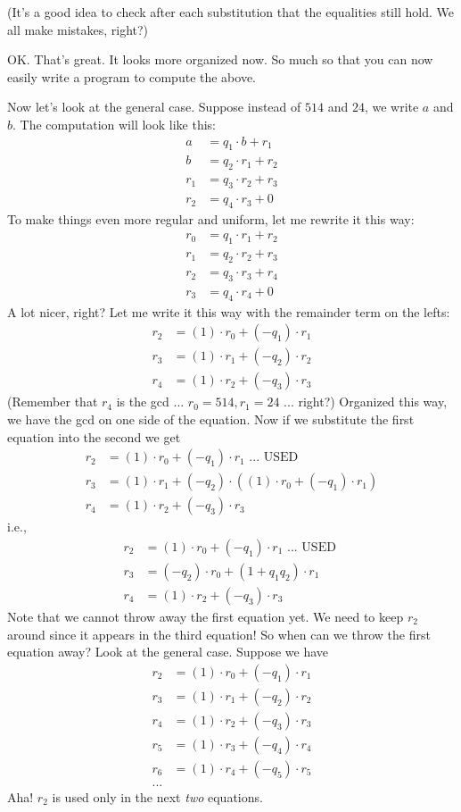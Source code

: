 (It's a good idea to check after each substitution that
the equalities still hold. We all make mistakes, right?)

OK.
That's great.
It looks more organized now.
So much so that you can now easily write a program to compute
the above.


Now let's look at the general case.
Suppose instead of $514$ and $24$, we write $a$ and $b$.
The computation will look like this:
\begin{align*}
a   &= q_1 \cdot b   + r_1 \\
b   &= q_2 \cdot r_1 + r_2 \\
r_1 &= q_3 \cdot r_2 + r_3 \\
r_2 &= q_4 \cdot r_3 + 0
\end{align*}
To make things even more regular and uniform, let me rewrite it this way:
\begin{align*}
r_0 &= q_1 \cdot r_1 + r_2 \\
r_1 &= q_2 \cdot r_2 + r_3 \\
r_2 &= q_3 \cdot r_3 + r_4 \\
r_3 &= q_4 \cdot r_4 + 0
\end{align*}
A lot nicer, right?
Let me write it this way with the remainder term on the lefts:
\begin{align*}
r_2 &= (1) \cdot r_0 + (-q_1) \cdot r_1 \\
r_3 &= (1) \cdot r_1 + (-q_2) \cdot r_2 \\
r_4 &= (1) \cdot r_2 + (-q_3) \cdot r_3 
\end{align*}
(Remember that $r_4$ is the gcd ... $r_0 = 514, r_1 = 24$ ... right?)
Organized this way, we have the gcd on one side of the equation.
Now if we substitute the first equation into the second we get
\begin{align*}
r_2 &= (1) \cdot r_0 + (-q_1) \cdot r_1 \text{ ... USED }\\
r_3 &= (1) \cdot r_1 + (-q_2) \cdot ((1) \cdot r_0 + (-q_1) \cdot r_1) \\
r_4 &= (1) \cdot r_2 + (-q_3) \cdot r_3 
\end{align*}
i.e.,
\begin{align*}
r_2 &= (1) \cdot r_0 + (-q_1) \cdot r_1 \text{ ... USED }\\
r_3 &= (-q_2) \cdot r_0 + (1 + q_1q_2) \cdot r_1 \\
r_4 &= (1) \cdot r_2 + (-q_3) \cdot r_3  
\end{align*}
Note that we cannot throw away the first equation yet.
We need to keep $r_2$ around since it appears in the third equation!
So when can we throw the first equation away?
Look at the general case.
Suppose we have
\begin{align*}
r_2 &= (1) \cdot r_0 + (-q_1) \cdot r_1  \\
r_3 &= (1) \cdot r_1 + (-q_2) \cdot r_2  \\
r_4 &= (1) \cdot r_2 + (-q_3) \cdot r_3  \\
r_5 &= (1) \cdot r_3 + (-q_4) \cdot r_4  \\
r_6 &= (1) \cdot r_4 + (-q_5) \cdot r_5  \\
...
\end{align*}
Aha! $r_2$ is used only in the next \textit{two} equations.

